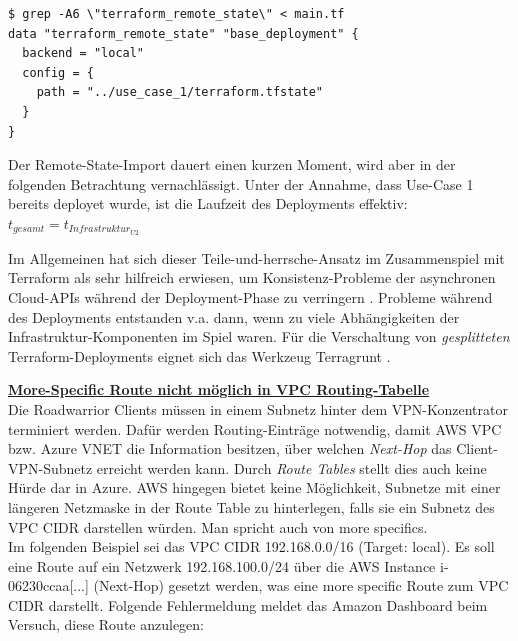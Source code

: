 \begin{lstlisting}[label=tf-remote-state-import,caption=.]
$ grep -A6 \"terraform_remote_state\" < main.tf
data "terraform_remote_state" "base_deployment" {
  backend = "local"
  config = {
    path = "../use_case_1/terraform.tfstate"
  }
}
\end{lstlisting}

Der Remote-State-Import dauert einen kurzen Moment, wird aber in der folgenden Betrachtung vernachlässigt.
Unter der Annahme, dass Use-Case 1 bereits deployet wurde, ist die Laufzeit des Deployments effektiv:\\
$t_{gesamt} = t_{Infrastruktur_{U2}}$

Im Allgemeinen hat sich dieser \glqq Teile-und-herrsche\grqq{}-Ansatz im Zusammenspiel mit Terraform als sehr hilfreich erwiesen, um Konsistenz-Probleme der asynchronen Cloud-APIs während der Deployment-Phase zu verringern \cite[S.183-184]{Brikman2019}. Probleme während des Deployments entstanden v.a. dann, wenn \glqq zu viele\grqq{} Abhängigkeiten der Infrastruktur-Komponenten im Spiel waren. Für die Verschaltung von \textit{gesplitteten} Terraform-Deployments eignet sich das Werkzeug Terragrunt \cite[S.98]{Brikman2019}.

\textbf{\underline{More-Specific Route nicht möglich in VPC Routing-Tabelle}}\\
Die Roadwarrior Clients müssen in einem Subnetz \glqq hinter\grqq{} dem VPN-Konzentrator terminiert werden. Dafür werden Routing-Einträge notwendig, damit AWS VPC bzw. Azure VNET die Information besitzen, über welchen \textit{Next-Hop} das Client-VPN-Subnetz erreicht werden kann. Durch \textit{Route Tables} stellt dies auch keine Hürde dar in Azure. AWS hingegen bietet keine Möglichkeit, Subnetze mit einer längeren Netzmaske in der Route Table zu hinterlegen, falls sie ein Subnetz des VPC CIDR darstellen würden. Man spricht auch von \glqq more specifics\grqq{}.\\
Im folgenden Beispiel sei das VPC CIDR 192.168.0.0/16 (Target: local). Es soll eine Route auf ein Netzwerk 192.168.100.0/24 über die AWS Instance \glqq i-06230ccaa[...]\grqq{} (Next-Hop) gesetzt werden, was eine more specific Route zum VPC CIDR darstellt.
Folgende Fehlermeldung meldet das Amazon Dashboard beim Versuch, diese Route anzulegen:


